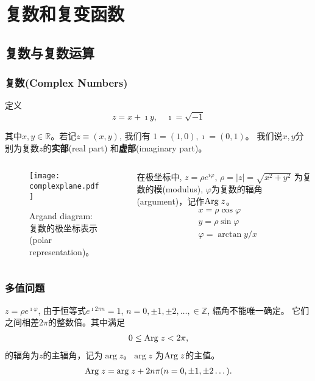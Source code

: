 \section{复数和复变函数}

\subsection{复数与复数运算}

\begin{frame}
\frametitle{复数(Complex Numbers)}

\begin{block}{定义}
    \begin{equation*}
        z = x + \imath y, \quad \imath = \sqrt{-1}
    \end{equation*} 
\end{block}
其中$x,y \in {\mathbb{R}}$。若记$z \equiv (x,y)$, 我们有
$1 = (1,0), \imath = (0, 1)$。
我们说$x,y$分别为复数$z$的{\bf 实部}(real part) 和{\bf 虚部}(imaginary part)。
\begin{columns}
\begin{column}{0.6\textwidth}
    \begin{figure}
        \texttt{[image: complexplane.pdf]}
        \caption{Argand diagram:复数的极坐标表示(polar representation)。}
    \end{figure}
\end{column}
\begin{column}{0.4\textwidth}   
     在极坐标中, $z=\rho e^{i\varphi}$, $\rho = |z|=\sqrt{x^2 + y^2}$ 为复数的模(modulus), $\varphi$为复数的辐角(argument)，记作${\mathrm{Arg}\;} z$。
    \begin{align*}
        & x = \rho \cos\varphi \\
        & y = \rho \sin\varphi \\
        & \varphi = \arctan y/x
    \end{align*}
\end{column}
\end{columns}
\end{frame}


\begin{frame}
    \frametitle{多值问题}
$z=\rho e^{\imath \varphi}$, 由于恒等式$e^{\imath 2\pi n} = 1$, $n = 0, \pm 1, \pm 2, \dots, \in \mathbb{Z}$, 辐角不能唯一确定。
它们之间相差$2\pi$的整数倍。其中满足
\begin{align*}
    0 \leq {\mathrm{Arg}\;} z < 2\pi,
\end{align*}
的辐角为$z$的主辐角，记为$\arg z$。$\arg z$ 为${\mathrm{Arg}\;} z$的主值。
\begin{align*}
    {\mathrm{Arg}\;} z = {\mathrm{arg}\;} z + 2 n \pi (n = 0, \pm 1, \pm 2\dots).
\end{align*}

\end{frame}


